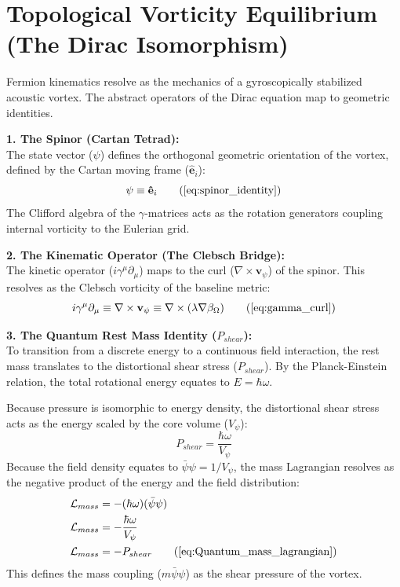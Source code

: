 \section{Topological Vorticity Equilibrium (The Dirac Isomorphism)}
\label{sec:deriv_dirac_isomorphism}

Fermion kinematics resolve as the mechanics of a gyroscopically stabilized acoustic vortex. The abstract operators of the Dirac equation map to geometric identities.

\textbf{1. The Spinor (Cartan Tetrad):} \\
The state vector ($\psi$) defines the orthogonal geometric orientation of the vortex, defined by the Cartan moving frame ($\mathbf{\hat{e}}_i$): 
\begin{equation}
    \psi \equiv \mathbf{\hat{e}}_i \tag{\ref{eq:spinor_identity}}
\end{equation}
The Clifford algebra of the $\gamma$-matrices acts as the rotation generators coupling internal vorticity to the Eulerian grid. 

\textbf{2. The Kinematic Operator (The Clebsch Bridge):} \\
The kinetic operator ($i\gamma^\mu \partial_\mu$) maps to the curl ($\nabla \times \mathbf{v}_\psi$) of the spinor. This resolves as the Clebsch vorticity of the baseline metric: 
\begin{equation}
    i\gamma^\mu \partial_\mu \equiv \nabla \times \mathbf{v}_\psi \equiv \nabla \times (\lambda \nabla \beta_\Omega) \tag{\ref{eq:gamma_curl}}
\end{equation}

\textbf{3. The Quantum Rest Mass Identity ($P_{shear}$):} \\
To transition from a discrete energy to a continuous field interaction, the rest mass translates to the distortional shear stress ($P_{shear}$). By the Planck-Einstein relation, the total rotational energy equates to $E = \hbar \omega$. 

Because pressure is isomorphic to energy density, the distortional shear stress acts as the energy scaled by the core volume ($V_{\psi}$): 
\begin{equation}
    P_{shear} = \frac{\hbar \omega}{V_{\psi}} \nonumber
\end{equation}
Because the field density equates to $\bar{\psi} \psi = 1 / V_{\psi}$, the mass Lagrangian resolves as the negative product of the energy and the field distribution: 
\begin{align}
    \mathcal{L}_{mass} &= - (\hbar \omega) (\bar{\psi} \psi) \nonumber \\
    \mathcal{L}_{mass} &= - \frac{\hbar \omega}{V_{\psi}} \nonumber \\
    \mathcal{L}_{mass} &= - P_{shear} \tag{\ref{eq:Quantum_mass_lagrangian}}
\end{align}
This defines the mass coupling ($m\bar{\psi}\psi$) as the shear pressure of the vortex. 

